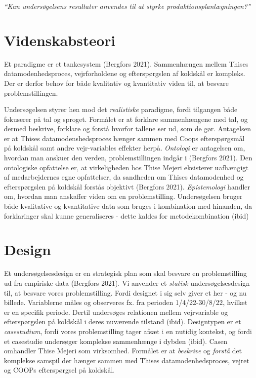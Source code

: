 \documentclass[
  12pt,
  a4paper,
  DIV=11,
  numbers=noendperiod]{scrartcl}
\begin{document}
\emph{``Kan undersøgelsens resultater anvendes til at styrke
produktionsplanlægningen?''}

\hypertarget{videnskabsteori}{%
\section{Videnskabsteori}\label{videnskabsteori}}

Et paradigme er et tankesystem (Bergfors 2021). Sammenhængen mellem
Thises datamodenhedsproces, vejrforholdene og efterspørgslen af koldskål
er kompleks. Der er derfor behov for både kvalitativ og kvantitativ
viden til, at besvare problemstillingen.

Undersøgelsen styrer hen mod det \emph{realistiske} paradigme, fordi
tilgangen både fokuserer på tal og sproget. Formålet er at forklare
sammenhængene med tal, og dermed beskrive, forklare og forstå hvorfor
tallene ser ud, som de gør. Antagelsen er at Thises datamodenshedsproces
hænger sammen med Coops efterspørgsmål på koldskål samt andre
vejr-variables effekter herpå. \emph{Ontologi} er antagelsen om, hvordan
man anskuer den verden, problemstillingen indgår i (Bergfors 2021). Den
ontologiske opfattelse er, at virkeligheden hos Thise Mejeri eksisterer
uafhængigt af medarbejdernes egne opfattelser, da sandheden om Thises
datamodenhed og efterspørgslen på koldskål forstås objektivt (Bergfors
2021). \emph{Epistemologi} handler om, hvordan man anskaffer viden om en
problemstilling. Undersøgelsen bruger både kvalitative og kvantitative
data som bruges i kombination med hinanden, da forklaringer skal kunne
generaliseres - dette kaldes for metodekombination (ibid)

\hypertarget{design}{%
\section{Design}\label{design}}

Et undersøgelsesdesign er en strategisk plan som skal besvare en
problemstilling ud fra empiriske data (Bergfors 2021). Vi anvender et
\emph{statisk} undersøgelsesdesign til, at besvare vores
problemstilling. Fordi designet i sig selv giver et her - og nu billede.
Variablerne måles og observeres fx. fra perioden 1/4/22-30/8/22, hvilket
er en specifik periode. Dertil undersøges relationen mellem vejrvariable
og efterspørgslen på koldskål i deres nuværende tilstand (ibid).
Designtypen er et \emph{casestudium}, fordi vores problemstilling tager
afsæt i en nutidig kontekst, og fordi et casestudie undersøger komplekse
sammenhænge i dybden (ibid). Casen omhandler Thise Mejeri som
virksomhed. Formålet er at \emph{beskrive} og \emph{forstå} det
komplekse samspil der hænger sammen med Thises datamodenhedsproces,
vejret og COOPs efterspørgsel på koldskål.
\end{document}
